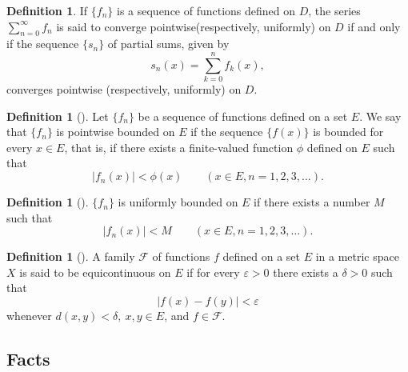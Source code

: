 \documentclass[	DIV=calc,paper=a4,fontsize=11pt]{scrartcl}	 	%
\theoremstyle{definition}
\newtheorem{defn}[thm]{Definition}
\theoremstyle{plain}
\theoremstyle{remark}
\begin{document}
\begin{defn}
If $\{f_n\}$ is a sequence of functions defined on $D$, the series $\sum_{n=0}^{\infty}f_n$ is said to converge pointwise(respectively, uniformly) on $D$ if and only if the sequence $\{s_n\}$ of partial sums, given by
$$s_n(x) =\sum_{k=0}^{n}f_k(x),$$
converges pointwise (respectively, uniformly) on $D$.
\end{defn}

\begin{defn}[\textbf{\color{blue}{Pointwise bounded}}]
Let $\{f_n\}$ be a sequence of functions defined on a set $E$. We say that $\{f_n\}$ is pointwise bounded on $E$ if the sequence $\{f(x)\}$ is bounded for every $x\in E$, that is, if there exists a finite-valued function $\phi$ defined on $E$ such that
$$|f_n(x)| < \phi(x) \qquad (x\in E, n = 1, 2, 3,\ldots).$$
\end{defn}
\begin{defn}[\textbf{\color{blue}{Uniformly bounded}}]
$\{f_n\}$ is uniformly bounded on $E$ if there exists a number $M$ such that
$$|f_n(x)|< M\qquad  (x\in E, n = 1, 2, 3,\ldots).$$
\end{defn}
\begin{defn}[\textbf{\color{blue}{Equicontinuous}}]
A family $\mathcal{F}$ of functions $f$ defined on a set $E$ in a metric space $X$ is said to be equicontinuous on $E$ if for every $\varepsilon > 0$ there exists a $\delta> 0$ such that
$$|f(x) - f(y)| < \varepsilon$$
whenever $d(x, y) < \delta,\ x,y\in E$, and $f\in \mathcal{F}$.
\end{defn}
\subsection{Facts}
\end{document}
